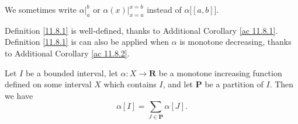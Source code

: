 \begin{note}
    We sometimes write \(\alpha\big|_a^b\) or \(\alpha(x)\big|_{x = a}^{x = b}\) instead of \(\alpha\big[[a, b]\big]\).
\end{note}

\begin{note}
    Definition \ref{11.8.1} is well-defined, thanks to Additional Corollary \ref{ac 11.8.1}.
    Definition \ref{11.8.1} is can also be applied when \(\alpha\) is monotone decreasing, thanks to Additional Corollary \ref{ac 11.8.2}.
\end{note}

\setcounter{theorem}{3}
\begin{lemma}\label{11.8.4}
    Let \(I\) be a bounded interval, let \(\alpha : X \to \mathbf{R}\) be a monotone increasing function defined on some interval \(X\) which contains \(I\), and let \(\mathbf{P}\) be a partition of \(I\).
    Then we have
    \[
        \alpha[I] = \sum_{J \in \mathbf{P}} \alpha[J].
    \]
\end{lemma}


